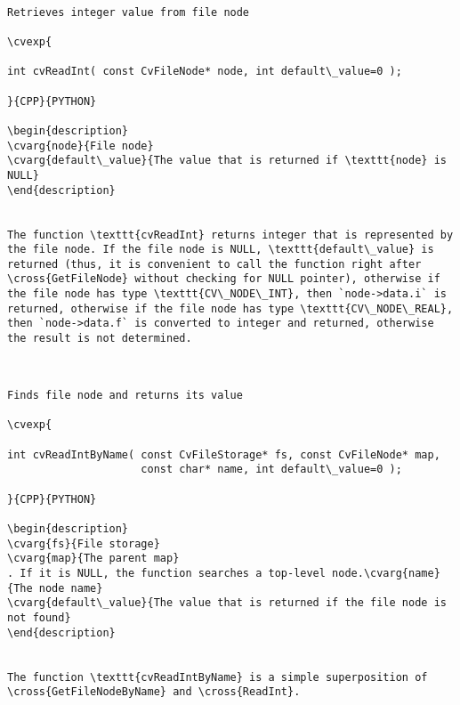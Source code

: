 \begin{verbatim}

Retrieves integer value from file node

\cvexp{

int cvReadInt( const CvFileNode* node, int default\_value=0 );

}{CPP}{PYTHON}

\begin{description}
\cvarg{node}{File node}
\cvarg{default\_value}{The value that is returned if \texttt{node} is NULL}
\end{description}


The function \texttt{cvReadInt} returns integer that is represented by the file node. If the file node is NULL, \texttt{default\_value} is returned (thus, it is convenient to call the function right after \cross{GetFileNode} without checking for NULL pointer), otherwise if the file node has type \texttt{CV\_NODE\_INT}, then `node->data.i` is returned, otherwise if the file node has type \texttt{CV\_NODE\_REAL}, then `node->data.f` is converted to integer and returned, otherwise the result is not determined.


\end{verbatim}
\begin{verbatim}

Finds file node and returns its value

\cvexp{

int cvReadIntByName( const CvFileStorage* fs, const CvFileNode* map,
                     const char* name, int default\_value=0 );

}{CPP}{PYTHON}

\begin{description}
\cvarg{fs}{File storage}
\cvarg{map}{The parent map}
. If it is NULL, the function searches a top-level node.\cvarg{name}{The node name}
\cvarg{default\_value}{The value that is returned if the file node is not found}
\end{description}


The function \texttt{cvReadIntByName} is a simple superposition of \cross{GetFileNodeByName} and \cross{ReadInt}.


\end{verbatim}
